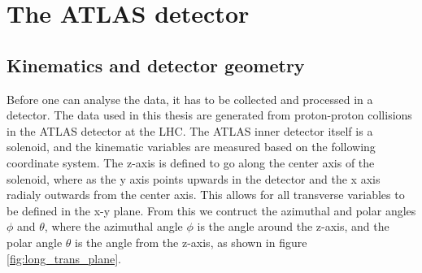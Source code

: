 \section{The ATLAS detector}

\subsection*{Kinematics and detector geometry}
Before one can analyse the data, it has to be collected and processed in a detector. The data used in this thesis 
are generated from proton-proton collisions in the ATLAS detector at the LHC. The ATLAS inner detector itself is a solenoid, 
and the kinematic variables are measured based on the following coordinate system. The z-axis is defined to go 
along the center axis of the solenoid, where as the y axis points upwards in the detector and the x axis radialy 
outwards from the center axis. This allows for all transverse variables to be defined in the x-y plane\cite{Gramstad:1631043}. 
From this we contruct the azimuthal and polar angles $\phi$ and $\theta$, where the azimuthal angle $\phi$\cite{Airapetian:391176} is the angle around the z-axis, 
and the polar angle $\theta$ is the angle from the z-axis, as shown in figure \ref{fig:long_trans_plane}.



